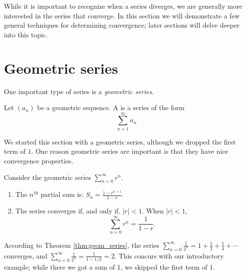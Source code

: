 \documentclass{ximera}
\begin{document}
While it is important to recognize when a series diverges, we are
generally more interested in the series that converge. In this section
we will demonstrate a few general techniques for determining
convergence; later sections will delve deeper into this topic.

\section{Geometric series}

One important type of series is a \textit{geometric series}.

\begin{definition}
Let $(a_n)$ be a geometric sequence. A  is a
series of the form
\[
\sum_{n=1}^\infty a_n
\]
\end{definition}

We started this section with a geometric series, although we dropped
the first term of $1$. One reason geometric series are important is
that they have nice convergence properties.

\begin{theorem}
Consider the geometric series $\sum_{n=0}^\infty r^n$.
\begin{enumerate}
\item The $n^\text{th}$ partial sum is: $S_n = \frac{1-r^{n+1}}{1-r}$.
\item The series converges if, and only if, $|r| < 1$. When $|r|<1$, 
\[
\sum_{n=0}^\infty r^n = \frac{1}{1-r}.
\]
\end{enumerate}
\end{theorem}

According to Theorem \ref{thm:geom_series}, the series
$\sum_{n=0}^\infty \frac{1}{2^n} = 1+\frac12+\frac14+\cdots$
converges, and $\sum_{n=0}^\infty \frac{1}{2^n} = \frac{1}{1-1/2} =
2.$ This concurs with our introductory example; while there we got a
sum of 1, we skipped the first term of 1.
\end{document}

